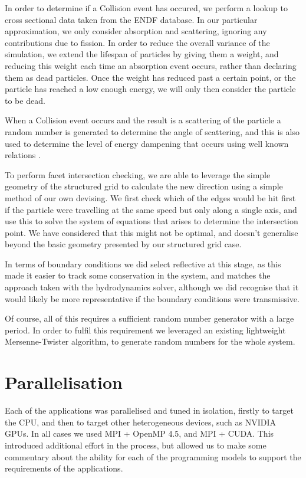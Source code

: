 \documentclass[runningheads,a4paper]{llncs}
\begin{document}
In order to determine if a Collision event has occured, we perform a lookup to cross sectional data taken from the ENDF database. In our particular approximation, we only consider absorption and scattering, ignoring any contributions due to fission. In order to reduce the overall variance of the simulation, we extend the lifespan of particles by giving them a weight, and reducing this weight each time an absorption event occurs, rather than declaring them as dead particles. Once the weight has reduced past a certain point, or the particle has reached a low enough energy, we will only then consider the particle to be dead.

When a Collision event occurs and the result is a scattering of the particle a random number is generated to determine the angle of scattering, and this is also used to determine the level of energy dampening that occurs using well known relations \cite{}.

To perform facet intersection checking, we are able to leverage the simple geometry of the structured grid to calculate the new direction using a simple method of our own devising. We first check which of the edges would be hit first if the particle were travelling at the same speed but only along a single axis, and use this to solve the system of equations that arises to determine the intersection point. We have considered that this might not be optimal, and doesn't generalise beyond the basic geometry presented by our structured grid case.

In terms of boundary conditions we did select reflective at this stage, as this made it easier to track some conservation in the system, and matches the approach taken with the hydrodynamics solver, although we did recognise that it would likely be more representative if the boundary conditions were transmissive.

Of course, all of this requires a sufficient random number generator with a large period. In order to fulfil this requirement we leveraged an existing lightweight Mersenne-Twister algorithm, to generate random numbers for the whole system.

\section{Parallelisation}

Each of the applications was parallelised and tuned in isolation, firstly to target the CPU, and then to target other heterogeneous devices, such as NVIDIA GPUs. In all cases we used MPI + OpenMP 4.5, and MPI + CUDA. This introduced additional effort in the process, but allowed us to make some commentary about the ability for each of the programming models to support the requirements of the applications.
\end{document}

